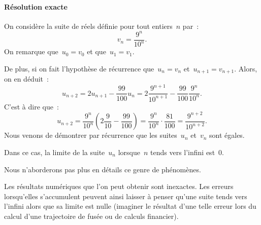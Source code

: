 \documentclass[12pt]{article}
\begin{document}
\paragraph{R\'esolution exacte}
On consid\`ere la suite de r\'eels d\'efinie pour tout entiers~$n$ par~:
\begin{equation}
  \label{eq:FormeExacte}
  v_{n} = \frac{9^{n}}{10^{n}}.
\end{equation}
On remarque que~${u_{0}=v_{0}}$ et que~${u_{1}=v_{1}}$.
\par
De plus, si on fait  l'hypoth\`ese de r\'ecurrence que~${u_{n}=v_{n}}$
et~${u_{n+1}=v_{n+1}}$. 
Alors, on en d\'eduit~:
$$
u_{n+2} = 2 u_{n+1} - \frac{99}{100} u_{n} = 
2\frac{9^{n+1}}{10^{n+1}} - \frac{99}{100}\frac{9^{n}}{10^{n}}  .
$$
C'est \`a dire que~:
$$
u_{n+2} = \frac{9^{n}}{10^{n}}(2\frac{9}{10} - \frac{99}{100})
=\frac{9^{n}}{10^{n}}\cdot\frac{81}{100} = \frac{9^{n+2}}{10^{n+2}}.
$$
Nous venons de  d\'emontrer par r\'ecurrence que les suites~$u_{n}$
et~$v_{n}$ sont \'egales.
\par
Dans  ce cas, la  limite  de la  suite~$u_{n}$ lorsque~$n$ tends  vers
l'infini est~$0$.
\par
Nous n'aborderons pas plus en d\'etails ce genre de ph\'enom\`enes.
\par
Les r\'esultats num\'eriques que l'on peut obtenir sont inexactes. Les
erreurs lorsqu'elles  s'accumulent peuvent  ainsi  laisser  \`a penser
qu'une   suite tends  vers l'infini  alors   que sa   limite est nulle
(imaginer  le  r\'esultat d'une  telle  erreur  lors  du calcul  d'une
trajectoire de fus\'ee ou de calculs financier).
\end{document}
